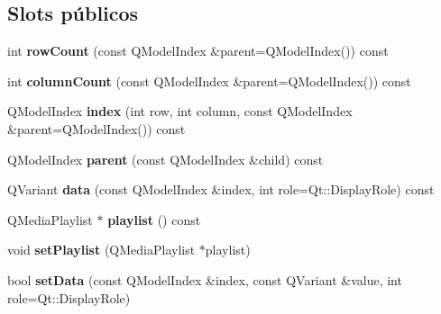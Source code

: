 \subsection*{Slots públicos}
\begin{DoxyCompactItemize}
\item 
\hypertarget{class_playlist_model_a2deef5b14f8f66431a55fdb0484025b6}{int {\bfseries row\-Count} (const Q\-Model\-Index \&parent=Q\-Model\-Index()) const }\label{class_playlist_model_a2deef5b14f8f66431a55fdb0484025b6}

\item 
\hypertarget{class_playlist_model_a50cd819e7dec4c4881eebaed8130944d}{int {\bfseries column\-Count} (const Q\-Model\-Index \&parent=Q\-Model\-Index()) const }\label{class_playlist_model_a50cd819e7dec4c4881eebaed8130944d}

\item 
\hypertarget{class_playlist_model_a03d1879138b2a0c6c68d7f6d98cfa92a}{Q\-Model\-Index {\bfseries index} (int row, int column, const Q\-Model\-Index \&parent=Q\-Model\-Index()) const }\label{class_playlist_model_a03d1879138b2a0c6c68d7f6d98cfa92a}

\item 
\hypertarget{class_playlist_model_a8ff71ee8d706da034fbe8b9b613a940c}{Q\-Model\-Index {\bfseries parent} (const Q\-Model\-Index \&child) const }\label{class_playlist_model_a8ff71ee8d706da034fbe8b9b613a940c}

\item 
\hypertarget{class_playlist_model_ac3d2bee2441ad8d13662833fd5968aac}{Q\-Variant {\bfseries data} (const Q\-Model\-Index \&index, int role=Qt\-::\-Display\-Role) const }\label{class_playlist_model_ac3d2bee2441ad8d13662833fd5968aac}

\item 
\hypertarget{class_playlist_model_afe7dce718749f036b23a8cf749dc4388}{Q\-Media\-Playlist $\ast$ {\bfseries playlist} () const }\label{class_playlist_model_afe7dce718749f036b23a8cf749dc4388}

\item 
\hypertarget{class_playlist_model_aaf551c97c7a8ded2a3d3333f15f558a5}{void {\bfseries set\-Playlist} (Q\-Media\-Playlist $\ast$playlist)}\label{class_playlist_model_aaf551c97c7a8ded2a3d3333f15f558a5}

\item 
\hypertarget{class_playlist_model_a61fcc4b9d0eaad86492c283b05c30fbc}{bool {\bfseries set\-Data} (const Q\-Model\-Index \&index, const Q\-Variant \&value, int role=Qt\-::\-Display\-Role)}\label{class_playlist_model_a61fcc4b9d0eaad86492c283b05c30fbc}

\end{DoxyCompactItemize}
